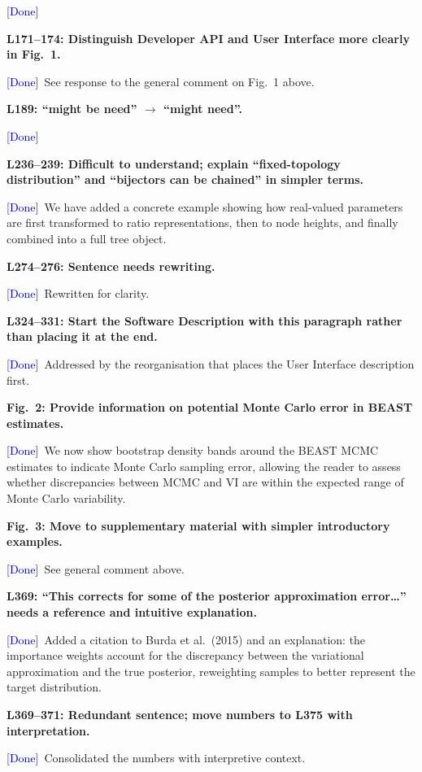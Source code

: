 \documentclass[11pt]{article}
\newcommand{\comment}[1]{\medskip\noindent\textbf{#1}\medskip}
\newcommand{\response}[1]{\noindent #1\medskip}
\newcommand{\done}{\textcolor{blue}{[Done]}}
\begin{document}
\response{\done}

\comment{L171--174: Distinguish Developer API and User Interface more clearly in Fig.~1.}

\response{\done\ See response to the general comment on Fig.~1 above.}

\comment{L189: ``might be need'' $\to$ ``might need''.}

\response{\done}

\comment{L236--239: Difficult to understand; explain ``fixed-topology distribution'' and ``bijectors can be chained'' in simpler terms.}

\response{\done\ We have added a concrete example showing how real-valued parameters are first transformed to ratio representations, then to node heights, and finally combined into a full tree object.}

\comment{L274--276: Sentence needs rewriting.}

\response{\done\ Rewritten for clarity.}

\comment{L324--331: Start the Software Description with this paragraph rather than placing it at the end.}

\response{\done\ Addressed by the reorganisation that places the User Interface description first.}

\comment{Fig.~2: Provide information on potential Monte Carlo error in BEAST estimates.}

\response{\done\ We now show bootstrap density bands around the BEAST MCMC estimates to indicate Monte Carlo sampling error, allowing the reader to assess whether discrepancies between MCMC and VI are within the expected range of Monte Carlo variability.}

\comment{Fig.~3: Move to supplementary material with simpler introductory examples.}

\response{\done\ See general comment above.}

\comment{L369: ``This corrects for some of the posterior approximation error\ldots'' needs a reference and intuitive explanation.}

\response{\done\ Added a citation to Burda et al.\ (2015) and an explanation: the importance weights account for the discrepancy between the variational approximation and the true posterior, reweighting samples to better represent the target distribution.}

\comment{L369--371: Redundant sentence; move numbers to L375 with interpretation.}

\response{\done\ Consolidated the numbers with interpretive context.}
\end{document}
